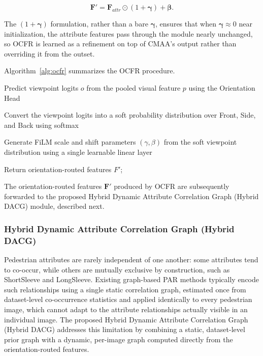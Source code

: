 \documentclass{ieeeaccess}
\begin{document}
\begin{equation}
\mathbf{F}'=\mathbf{F}_{attr}\odot(1+\boldsymbol{\gamma})+\boldsymbol{\beta}.
\label{eq:ocfr_output}
\end{equation}

The $(1+\boldsymbol{\gamma})$ formulation, rather than a bare $\boldsymbol{\gamma}$, ensures that when $\boldsymbol{\gamma}\approx 0$ near initialization, the attribute features pass through the module nearly unchanged, so OCFR is learned as a refinement on top of CMAA's output rather than overriding it from the outset.

Algorithm~\ref{alg:ocfr} summarizes the OCFR procedure.
\begin{algorithm}[H]
\caption{Orientation-Conditioned Feature Routing (OCFR)}
\label{alg:ocfr}

Predict viewpoint logits $o$ from the pooled visual feature $p$ using the Orientation Head\;

Convert the viewpoint logits into a soft probability distribution over Front, Side, and Back using softmax\;

Generate FiLM scale and shift parameters $(\gamma,\beta)$ from the soft viewpoint distribution using a single learnable linear layer\;


Return orientation-routed features $F'$;

\end{algorithm}

The orientation-routed features $\mathbf{F}'$ produced by OCFR are subsequently forwarded to the proposed Hybrid Dynamic Attribute Correlation Graph (Hybrid DACG) module, described next.

\subsubsection{Hybrid Dynamic Attribute Correlation Graph (Hybrid DACG)}

Pedestrian attributes are rarely independent of one another: some attributes tend to co-occur, while others are mutually exclusive by construction, such as ShortSleeve and LongSleeve. Existing graph-based PAR methods typically encode such relationships using a single static correlation graph, estimated once from dataset-level co-occurrence statistics and applied identically to every pedestrian image, which cannot adapt to the attribute relationships actually visible in an individual image. The proposed Hybrid Dynamic Attribute Correlation Graph (Hybrid DACG) addresses this limitation by combining a static, dataset-level prior graph with a dynamic, per-image graph computed directly from the orientation-routed features.
\end{document}
